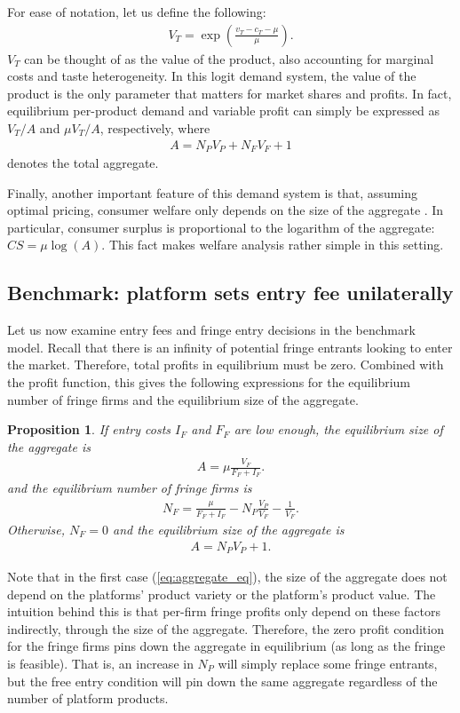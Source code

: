 \documentclass[a4paper]{article}
\newtheorem{proposition}{Proposition}
\begin{document}
For ease of notation, let us define the following:
\begin{align*}
    V_T = \exp \left( \frac{v_T - c_T - \mu}{\mu} \right).
\end{align*}
$V_T$ can be thought of as the value of the product, also accounting for marginal costs and taste heterogeneity.
In this logit demand system, the value of the product is the only parameter that matters for market shares and profits.
In fact, equilibrium per-product demand and variable profit can simply be expressed as $V_T/ A$ and $\mu V_T/ A$, respectively, where
\begin{align*}
    A = N_P V_P + N_F V_F + 1
\end{align*}
denotes the total aggregate.

Finally, another important feature of this demand system is that, assuming optimal pricing, consumer welfare only depends on the size of the aggregate \parencite{anderson2020aggregative}.
In particular, consumer surplus is proportional to the logarithm of the aggregate: $CS = \mu \log(A)$. This fact makes welfare analysis rather simple in this setting.

\subsection{Benchmark: platform sets entry fee unilaterally}

Let us now examine entry fees and fringe entry decisions in the benchmark model.
Recall that there is an infinity of potential fringe entrants looking to enter the market.
Therefore, total profits in equilibrium must be zero.
Combined with the  profit function, this gives the following expressions for the equilibrium number of fringe firms and the equilibrium size of the aggregate.
\begin{proposition}
    \label{prop:equilibrium_aggregate_benchmark}
    If entry costs $I_F$ and $F_F$ are low enough, the equilibrium size of the aggregate is
    \begin{align}
        A = \mu \frac{V_F}{F_F + I_F}.
        \label{eq:aggregate_eq}
    \end{align}
    and the equilibrium number of fringe firms is
    \begin{align*}
        N_F = \frac{\mu}{F_F + I_F} - N_P \frac{V_P}{V_F} - \frac{1}{V_F}.
    \end{align*}
    Otherwise,  $N_F = 0$ and the equilibrium size of the aggregate is
    \begin{align*}
        A = N_P V_P + 1.
    \end{align*}
\end{proposition}
Note that in the first case (\cref{eq:aggregate_eq}), the size of the aggregate does not depend on the platforms' product variety or the platform's product value.
The intuition behind this is that per-firm fringe profits only depend on these factors indirectly, through the size of the aggregate.
Therefore, the zero profit condition for the fringe firms pins down the aggregate in equilibrium (as long as the fringe is feasible).
That is, an increase in $N_P$ will simply replace some fringe entrants, but the free entry condition will pin down the same aggregate regardless of the number of platform products.
\end{document}
